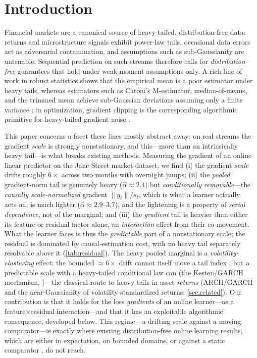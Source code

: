 \documentclass{article}
\newcommand{\norm}[1]{\lVert #1 \rVert}
\newcommand{\gt}{g_t}
\begin{document}
\section{Introduction}
\label{sec:intro}

Financial markets are a canonical source of heavy-tailed, distribution-free data:
returns and microstructure signals exhibit power-law tails, occasional data errors
act as adversarial contamination, and assumptions such as sub-Gaussianity are
untenable. Sequential prediction on such streams therefore calls for
\emph{distribution-free} guarantees that hold under weak moment assumptions only.
A rich line of work in robust statistics shows that the empirical mean is a poor
estimator under heavy tails, whereas estimators such as Catoni's M-estimator,
median-of-means, and the trimmed mean achieve sub-Gaussian deviations assuming only a
finite variance \citep{catoni2012,devroye2016,lugosi2019}; in optimization, gradient
clipping is the corresponding algorithmic primitive for heavy-tailed gradient noise
\citep{zhang2020clip,gorbunov2020,nguyen2023}.

This paper concerns a facet these lines mostly abstract away: on real streams the
gradient \emph{scale} is strongly nonstationary, and this---more than an intrinsically
heavy tail---is what breaks existing methods. Measuring the gradient of an online linear
predictor on the Jane Street market dataset, we find (i) the gradient \emph{scale}
drifts roughly $6\times$ across two months with overnight jumps; (ii) the \emph{pooled}
gradient-norm tail is genuinely heavy ($\hat\alpha\approx2.4$) but \emph{conditionally
removable}---the \emph{causally scale-normalized} gradient $\norm{\gt}/s_t$, which is what
a learner actually acts on, is much lighter ($\hat\alpha\approx2.9$--$3.7$), and the
lightening is a property of \emph{serial dependence}, not of the marginal; and (iii) the
\emph{gradient} tail is heavier than either its feature or residual factor alone, an
\emph{interaction} effect from their co-movement. What the learner faces is thus the
\emph{predictable} part of a nonstationary scale; the residual is dominated by
causal-estimation cost, with no heavy tail separately resolvable above it
(\cref{tab:residual}). The
heavy pooled marginal is a \emph{volatility-clustering} effect: the bounded $\approx6\times$
drift cannot itself move a tail index \citep{breiman1965}, but a predictable scale with a
heavy-tailed conditional law can (the Kesten/GARCH mechanism, \citealt{kesten1973})---the
classical route to heavy tails in asset \emph{returns} (ARCH/GARCH and the near-Gaussianity
of volatility-standardized returns; \cref{sec:related}). Our contribution is that it holds
for the loss \emph{gradients} of an online learner---as a feature$\times$residual
interaction---and that it has an exploitable algorithmic consequence, developed below. This regime---a drifting scale against a moving
comparator---is exactly where existing distribution-free online learning results, which
are either in expectation, on bounded domains, or against a static comparator
\citep{liu2026oco,zhangcutkosky2022}, do not reach.
\end{document}
